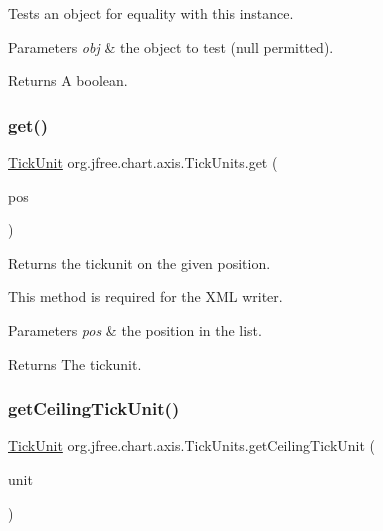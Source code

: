 Tests an object for equality with this instance.


\begin{DoxyParams}{Parameters}
{\em obj} & the object to test ({\ttfamily null} permitted).\\
\hline
\end{DoxyParams}
\begin{DoxyReturn}{Returns}
A boolean. 
\end{DoxyReturn}
\mbox{\label{classorg_1_1jfree_1_1chart_1_1axis_1_1_tick_units_a3199d72d88c387fc35b85dc8d70f780a}} 
\subsubsection{\texorpdfstring{get()}{get()}}
{\footnotesize\ttfamily \mbox{\hyperlink{classorg_1_1jfree_1_1chart_1_1axis_1_1_tick_unit}{Tick\+Unit}} org.\+jfree.\+chart.\+axis.\+Tick\+Units.\+get (\begin{DoxyParamCaption}\item[{int}]{pos }\end{DoxyParamCaption})}

Returns the tickunit on the given position. 

This method is required for the X\+ML writer.


\begin{DoxyParams}{Parameters}
{\em pos} & the position in the list.\\
\hline
\end{DoxyParams}
\begin{DoxyReturn}{Returns}
The tickunit. 
\end{DoxyReturn}
\mbox{\label{classorg_1_1jfree_1_1chart_1_1axis_1_1_tick_units_a925a94d152ae23f36f676bd9a0dee5e3}} 
\subsubsection{\texorpdfstring{get\+Ceiling\+Tick\+Unit()}{getCeilingTickUnit()}\hspace{0.1cm}{\footnotesize\ttfamily [1/2]}}
{\footnotesize\ttfamily \mbox{\hyperlink{classorg_1_1jfree_1_1chart_1_1axis_1_1_tick_unit}{Tick\+Unit}} org.\+jfree.\+chart.\+axis.\+Tick\+Units.\+get\+Ceiling\+Tick\+Unit (\begin{DoxyParamCaption}\item[{\mbox{\hyperlink{classorg_1_1jfree_1_1chart_1_1axis_1_1_tick_unit}{Tick\+Unit}}}]{unit }\end{DoxyParamCaption})}

